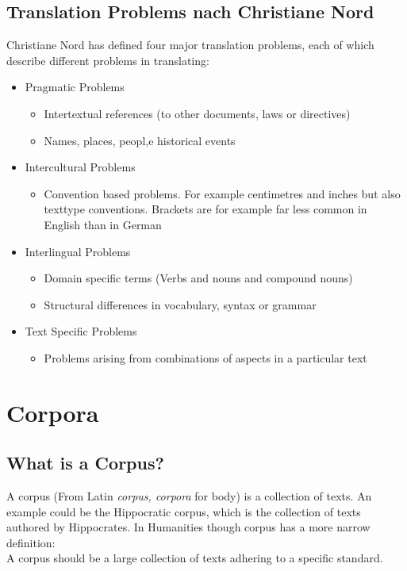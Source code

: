 \documentclass{article}
\begin{document}
	\subsection{Translation Problems nach Christiane Nord}
	Christiane Nord has defined four major translation problems, each of which describe different problems in translating:
	\begin{itemize}
		\item{Pragmatic Problems}
		\begin{itemize}
			\item{Intertextual references (to other documents, laws or directives)}
			\item{Names, places, peopl,e historical events}
		\end{itemize}
		\item{Intercultural Problems}
		\begin{itemize}
			\item{Convention based problems. For example centimetres and inches but also texttype conventions. Brackets are for example far less common in English than in German}
		\end{itemize}
		\item{Interlingual Problems}
		\begin{itemize}
			\item{Domain specific terms (Verbs and nouns and compound nouns)}
			\item{Structural differences in vocabulary, syntax or grammar}
		\end{itemize}
		\item{Text Specific Problems}
		\begin{itemize}
			\item{Problems arising from combinations of aspects in a particular text}
		\end{itemize}
	\end{itemize}
	\section{Corpora}
	\subsection{What is a Corpus?}
	A corpus (From Latin \textit{corpus, corpora} for body) is a collection of texts. An example could be the Hippocratic corpus, which is the collection of texts authored by Hippocrates. In Humanities though corpus has a more narrow definition: \\
	A corpus should be a large collection of texts adhering to a specific standard.
\end{document}
